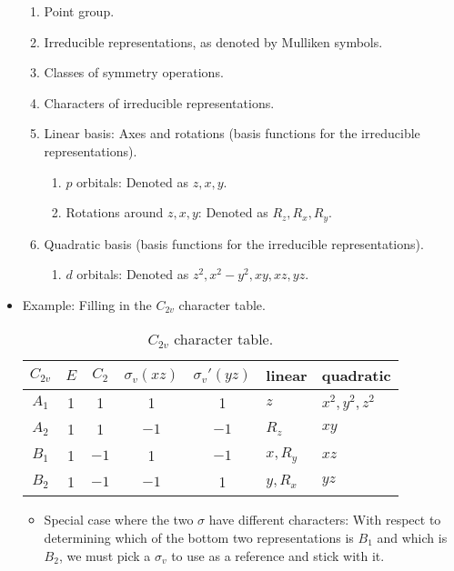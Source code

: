 \documentclass[../notes.tex]{subfiles}
\begin{document}
\begin{itemize}
\begin{enumerate}
        \item Point group.
        \item Irreducible representations, as denoted by Mulliken symbols.
        \item Classes of symmetry operations.
        \item Characters of irreducible representations.
        \item Linear basis: Axes and rotations (basis functions for the irreducible representations).
        \begin{enumerate}
            \item $p$ orbitals: Denoted as $z,x,y$.
            \item Rotations around $z,x,y$: Denoted as $R_z,R_x,R_y$.
        \end{enumerate}
        \item Quadratic basis (basis functions for the irreducible representations).
        \begin{enumerate}
            \item $d$ orbitals: Denoted as $z^2,x^2-y^2,xy,xz,yz$.
        \end{enumerate}
    \end{enumerate}
    \item Example: Filling in the $C_{2v}$ character table.
    \begin{table}[H]
        \centering
        \small
        \renewcommand{\arraystretch}{1.2}
        \begin{tabular}{c|cccc|l|l}
            $C_{2v}$ & $E$ & $C_2$ & $\sigma_v(xz)$ & $\sigma_v'(yz)$ & linear & quadratic\\
            \hline
            $A_1$ & 1 & 1 & 1 & 1 & $z$ & $x^2,y^2,z^2$\\
            $A_2$ & 1 & 1 & $-1$ & $-1$ & $R_z$ & $xy$\\
            $B_1$ & 1 & $-1$ & 1 & $-1$ & $x,R_y$ & $xz$\\
            $B_2$ & 1 & $-1$ & $-1$ & 1 & $y,R_x$ & $yz$\\
        \end{tabular}
        \caption{$C_{2v}$ character table.}
        \label{tab:charTableC2v}
    \end{table}
    \begin{itemize}
        \item Special case where the two $\sigma$ have different characters: With respect to determining which of the bottom two representations is $B_1$ and which is $B_2$, we must pick a $\sigma_v$ to use as a reference and stick with it.
    \end{itemize}
\end{itemize}
\end{document}
